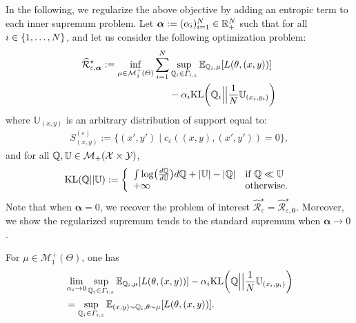 In the following, we regularize the above objective by adding an entropic term to each inner supremum problem. Let $\bm{\alpha}:=(\alpha_i)_{i=1}^N\in\mathbb{R}_+^N$ such that for all $i\in\{1,\dots,N\}$, and let us consider the following optimization problem:
\begin{equation*}
\begin{aligned}
\label{eq-legendre-KL}
\widehat{\mathcal{R}}_{\varepsilon,\bm{\alpha}}^{\star}:=\inf_{\mu\in \mathcal{M}^+_1(\Theta)}\sum_{i=1}^\numsamples&\sup_{\QQ_i\in\Gamma_{i,\varepsilon}}\mathbb{E}_{ \QQ_i, \mu}\left[\loss(\theta,(x,y))\right]\\
&-\alpha_i\text{KL}\left(\QQ_i\Big|\Big|\frac{1}{\numsamples}\mathbb{U}_{(x_i,y_i)}\right)
\end{aligned}
\end{equation*}
where $\mathbb{U}_{(x,y)}$ is an arbitrary distribution of support equal to:
\begin{align*}
    S_{(x,y)}^{(\varepsilon)}:=\Big\{(x',y')\mid c_{\varepsilon}((x,y),(x',y'))=0\Big\},
\end{align*}
and for all $\mathbb{Q},\mathbb{U}\in\mathcal{M}_{+}(\mathcal{X}\times\mathcal{Y})$,
\begin{align*}
\text{KL}(\QQ||\mathbb{U}):=  \left\{
    \begin{array}{lll}
        \int\log(\frac{d\QQ}{d\mathbb{U}})d\QQ+|\mathbb{U}| - |\QQ| &  \mbox{if } \QQ\ll \mathbb{U}\\
        +\infty & \mbox{otherwise.}
    \end{array}
\right.
\end{align*}
Note that when $\bm{\alpha}=0$, we recover the problem of interest $\widehat{\mathcal{R}}_{\varepsilon}^{\star}=\widehat{\mathcal{R}}_{\varepsilon,\bm{0}}^{\star}$. Moreover, we show the regularized supremum tends to the standard supremum when $\bm{\alpha}\to 0$.
\begin{prop}
\label{prop:limit-eps}
For $\mu\in\mathcal{M}_{1}^{+}(\Theta)$, one has
\begin{align*}
    &\lim_{\alpha_i\rightarrow 0}\sup_{\QQ_i\in\Gamma_{i,\varepsilon}}\mathbb{E}_{\QQ_i,\mu}\left[\loss(\theta,(x,y))\right]-\alpha_i\text{KL}\left(\QQ\Big|\Big|\frac{1}{\numsamples}\mathbb{U}_{(x_i,y_i)}\right)\\
    &=\sup_{\QQ_i\in\Gamma_{i,\varepsilon}}\mathbb{E}_{(x,y)\sim \QQ_i,\theta \sim \mu}\left[\loss(\theta,(x,y))\right].
\end{align*}
\end{prop}

